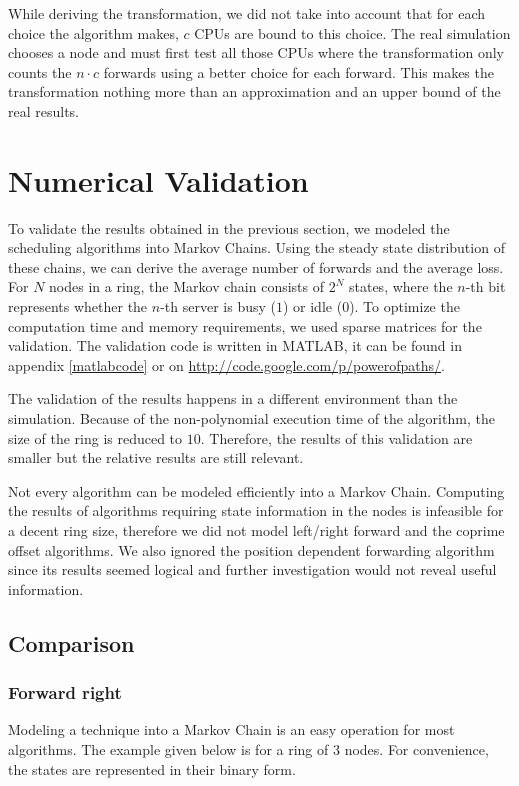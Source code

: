 \documentclass[10pt,a4paper]{article}
\begin{document}
While deriving the transformation, we did not take into account that for each choice the algorithm makes, $c$ CPUs are bound to this choice. The real simulation chooses a node and must first test all those CPUs where the transformation only counts the $n \cdot c$ forwards using a better choice for each forward. This makes the transformation nothing more than an approximation and an upper bound of the real results.

\section{Numerical Validation}
\label{secvalidation}

To validate the results obtained in the previous section, we modeled the scheduling algorithms into Markov Chains. Using the steady state distribution of these chains, we can derive the average number of forwards and the average loss.
For $N$ nodes in a ring, the Markov chain consists of $2^N$ states, where the $n$-th bit represents whether the $n$-th server is busy ($1$) or idle ($0$). To optimize the computation time and memory requirements, we used sparse matrices for the validation. The validation code is written in MATLAB, it can be found in appendix \ref{matlabcode} or on \url{http://code.google.com/p/powerofpaths/}.

The validation of the results happens in a different environment than the simulation. Because of the non-polynomial execution time of the algorithm, the size of the ring is reduced to $10$. Therefore, the results of this validation are smaller but the relative results are still relevant.

Not every algorithm can be modeled efficiently into a Markov Chain. Computing the results of algorithms requiring state information in the nodes is infeasible for a decent ring size, therefore we did not model left/right forward and the coprime offset algorithms. We also ignored the position dependent forwarding algorithm since its results seemed logical and further investigation would not reveal useful information.

\subsection{Comparison}
\subsubsection*{Forward right}
Modeling a technique into a Markov Chain is an easy operation for most algorithms. The example given below is for a ring of 3 nodes. For convenience, the states are represented in their binary form.
\end{document}
